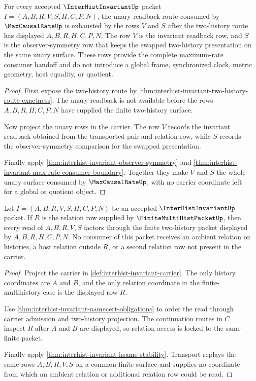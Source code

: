 \begin{theorem}
\label{thm:interhist-invariant-unary-readback-coverage}
For every accepted $\InterHistInvariantUp$ packet $I=(A,B,R,V,S,H,C,P,N)$, the unary readback route consumed by $\MaxCausalRateUp$ is exhausted by the rows $V$ and $S$ after the two-history route has displayed $A,B,R,H,C,P,N$. The row $V$ is the invariant readback row, and $S$ is the observer-symmetry row that keeps the swapped two-history presentation on the same unary surface. These rows provide the complete maximum-rate consumer handoff and do not introduce a global frame, synchronized clock, metric geometry, host equality, or quotient.
\end{theorem}
\begin{proof}
First expose the two-history route by \autoref{thm:interhist-invariant-two-history-route-exactness}. The unary readback is not available before the rows $A,B,R,H,C,P,N$ have supplied the finite two-history surface.

Now project the unary rows in the carrier. The row $V$ records the invariant readback obtained from the transported pair and relation row, while $S$ records the observer-symmetry comparison for the swapped presentation.

Finally apply \autoref{thm:interhist-invariant-observer-symmetry} and \autoref{thm:interhist-invariant-max-rate-consumer-boundary}. Together they make $V$ and $S$ the whole unary surface consumed by $\MaxCausalRateUp$, with no carrier coordinate left for a global or quotient object.
\end{proof}

\begin{theorem}
\label{thm:interhist-invariant-finite-multihist-projection-lock}
Let $I=(A,B,R,V,S,H,C,P,N)$ be an accepted $\InterHistInvariantUp$ packet. If $R$ is the relation row supplied by $\FiniteMultiHistPacketUp$, then every read of $A,B,R,V,S$ factors through the finite two-history packet displayed by $A,B,R,H,C,P,N$. No consumer of this packet receives an ambient relation on histories, a host relation outside $R$, or a second relation row not present in the carrier.
\end{theorem}
\begin{proof}
Project the carrier in \autoref{def:interhist-invariant-carrier}. The only history coordinates are $A$ and $B$, and the only relation coordinate in the finite-multihistory case is the displayed row $R$.

Use \autoref{thm:interhist-invariant-namecert-obligations} to order the read through carrier admission and two-history projection. The continuation routes in $C$ inspect $R$ after $A$ and $B$ are displayed, so relation access is locked to the same finite packet.

Finally apply \autoref{thm:interhist-invariant-hsame-stability}. Transport replays the same rows $A,B,R,V,S$ on a common finite surface and supplies no coordinate from which an ambient relation or additional relation row could be read.
\end{proof}

